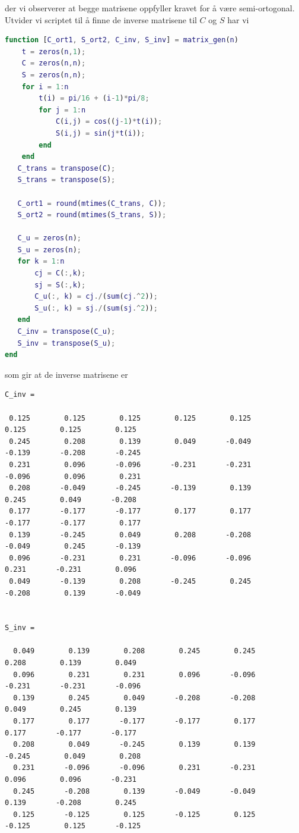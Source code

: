 \documentclass[12pt,
               a4paper,
               article,
               oneside,
               oldfontcommands,
               norsk]{memoir}
\begin{document}
der vi observerer at begge matrisene oppfyller kravet for å være semi-ortogonal. Utvider vi scriptet til å finne de inverse matrisene til $C$ og $S$ har vi
\begin{lstlisting}[language=MATLAB]
function [C_ort1, S_ort2, C_inv, S_inv] = matrix_gen(n)
    t = zeros(n,1);
    C = zeros(n,n);
    S = zeros(n,n);
    for i = 1:n
        t(i) = pi/16 + (i-1)*pi/8;
        for j = 1:n
            C(i,j) = cos((j-1)*t(i));
            S(i,j) = sin(j*t(i));
        end
    end
   C_trans = transpose(C);
   S_trans = transpose(S);
   
   C_ort1 = round(mtimes(C_trans, C));
   S_ort2 = round(mtimes(S_trans, S));  
   
   C_u = zeros(n);
   S_u = zeros(n);
   for k = 1:n
       cj = C(:,k);
       sj = S(:,k);
       C_u(:, k) = cj./(sum(cj.^2));
       S_u(:, k) = sj./(sum(sj.^2));
   end
   C_inv = transpose(C_u);
   S_inv = transpose(S_u); 
end
\end{lstlisting}
som gir at de inverse matrisene er
\begin{verbatim}
C_inv =

 0.125        0.125        0.125        0.125        0.125        0.125        0.125        0.125
 0.245        0.208        0.139        0.049       -0.049       -0.139       -0.208       -0.245
 0.231        0.096       -0.096       -0.231       -0.231       -0.096        0.096        0.231
 0.208       -0.049       -0.245       -0.139        0.139        0.245        0.049       -0.208
 0.177       -0.177       -0.177        0.177        0.177       -0.177       -0.177        0.177
 0.139       -0.245        0.049        0.208       -0.208       -0.049        0.245       -0.139
 0.096       -0.231        0.231       -0.096       -0.096        0.231       -0.231        0.096
 0.049       -0.139        0.208       -0.245        0.245       -0.208        0.139       -0.049


S_inv =

  0.049        0.139        0.208        0.245        0.245        0.208        0.139        0.049
  0.096        0.231        0.231        0.096       -0.096       -0.231       -0.231       -0.096
  0.139        0.245        0.049       -0.208       -0.208        0.049        0.245        0.139
  0.177        0.177       -0.177       -0.177        0.177        0.177       -0.177       -0.177
  0.208        0.049       -0.245        0.139        0.139       -0.245        0.049        0.208
  0.231       -0.096       -0.096        0.231       -0.231        0.096        0.096       -0.231
  0.245       -0.208        0.139       -0.049       -0.049        0.139       -0.208        0.245
  0.125       -0.125        0.125       -0.125        0.125       -0.125        0.125       -0.125
\end{verbatim}
\end{document}
